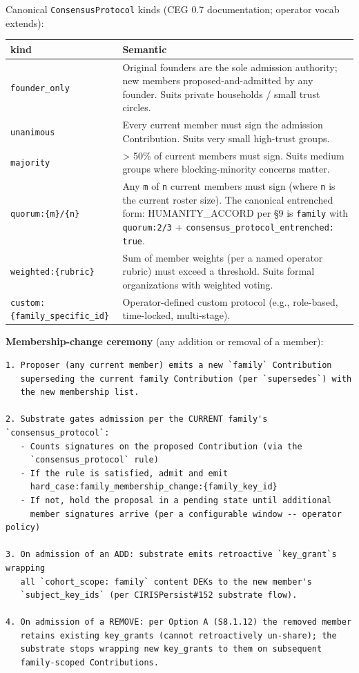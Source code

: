\documentclass[11pt]{article}
\begin{document}
Canonical \texttt{ConsensusProtocol} kinds (CEG 0.7 documentation; operator vocab extends):


{\footnotesize
\begin{longtable}{|p{8.0cm}|p{8.0cm}|}\hline
\textbf{kind} & \textbf{Semantic} \\ \hline\endhead
\texttt{founder\_only} & Original founders are the sole admission authority; new members proposed-and-admitted by any founder. Suits private households / small trust circles. \\ \hline
\texttt{unanimous} & Every current member must sign the admission Contribution. Suits very small high-trust groups. \\ \hline
\texttt{majority} & > 50\% of current members must sign. Suits medium groups where blocking-minority concerns matter. \\ \hline
\texttt{quorum:\{m\}/\{n\}} & Any \texttt{m} of \texttt{n} current members must sign (where \texttt{n} is the current roster size). The canonical entrenched form: HUMANITY\_ACCORD per §9 is \texttt{family} with \texttt{quorum:2/3} + \texttt{consensus\_protocol\_entrenched: true}. \\ \hline
\texttt{weighted:\{rubric\}} & Sum of member weights (per a named operator rubric) must exceed a threshold. Suits formal organizations with weighted voting. \\ \hline
\texttt{custom:\{family\_specific\_id\}} & Operator-defined custom protocol (e.g., role-based, time-locked, multi-stage). \\ \hline
\end{longtable}}


\textbf{Membership-change ceremony} (any addition or removal of a member):


\begin{lstlisting}
1. Proposer (any current member) emits a new `family` Contribution
   superseding the current family Contribution (per `supersedes`) with
   the new membership list.

2. Substrate gates admission per the CURRENT family's `consensus_protocol`:
   - Counts signatures on the proposed Contribution (via the
     `consensus_protocol` rule)
   - If the rule is satisfied, admit and emit
     hard_case:family_membership_change:{family_key_id}
   - If not, hold the proposal in a pending state until additional
     member signatures arrive (per a configurable window -- operator policy)

3. On admission of an ADD: substrate emits retroactive `key_grant`s wrapping
   all `cohort_scope: family` content DEKs to the new member's
   `subject_key_ids` (per CIRISPersist#152 substrate flow).

4. On admission of a REMOVE: per Option A (S8.1.12) the removed member
   retains existing key_grants (cannot retroactively un-share); the
   substrate stops wrapping new key_grants to them on subsequent
   family-scoped Contributions.
\end{lstlisting}
\end{document}
